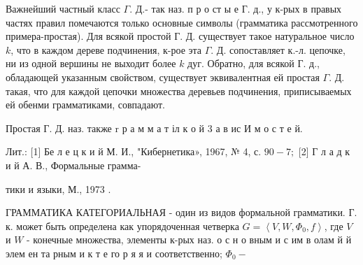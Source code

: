 \documentclass[10pt]{article}
\begin{document}
Важнейший частный класс $\Gamma$. Д.- так наз. п р о ст ы е Г. д., у к-рых в правых частях правил помечаются только основные символы (грамматика рассмотренного примера-простая). Для всякой простой Г. Д. существует такое натуральное число $k$, что в каждом дереве подчинения, к-рое эта $\Gamma$. Д. сопоставляет к.-л. цепочке, ни из одной вершины не выходит более $k$ дуг. Обратно, для всякой Г. д., обладающей указанным свойством, существует эквивалентная ей простая $\Gamma$. Д. такая, что для каждой цепочки множества деревьев подчинения, приписываемых ей обенми грамматиками, совпадают.



Простая $Г$. Д. наз. также $\mathrm{r}$ р а м м а т іл к о й 3 а в ис И м о с т е й.



Лит.: [1] Бе л е ц к и й М. И., "Кибернетика», 1967, № 4, с. $90-7 ;$ [2] Г л а д к и й А. В., Формальные грамма-

тики и языки, М., 1973 .



ГРАММАТИКА КАТЕГОРИАЛЬНАЯ - один из видов формальной грамматики. Г. к. может быть определена как упорядоченная четверка $G=\left\langle V, W, \Phi_{0}, f\right\rangle$, где $V$ и $W$ - конечные множества, элементы к-рых наз. о с н о вным и с им в олам й й элем ен та рным и к т е го р я я и соответственно; $\Phi_{0}-$
\end{document}
